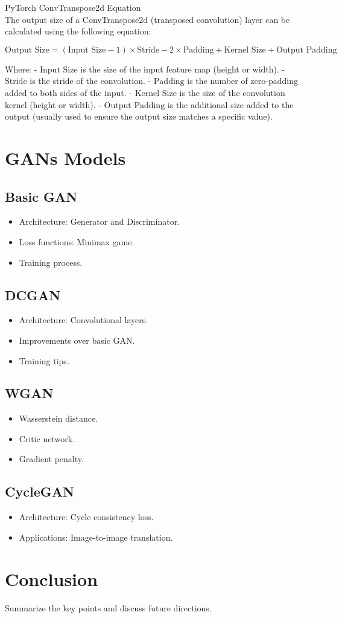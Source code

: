 \documentclass{article}
\begin{document}
PyTorch ConvTranspose2d Equation\\

The output size of a ConvTranspose2d (transposed convolution) layer can be calculated using the following equation:

\[ \text{Output Size} = (\text{Input Size} - 1) \times \text{Stride} - 2 \times \text{Padding} + \text{Kernel Size} + \text{Output Padding} \]

Where:
- \(\text{Input Size}\) is the size of the input feature map (height or width).
- \(\text{Stride}\) is the stride of the convolution.
- \(\text{Padding}\) is the number of zero-padding added to both sides of the input.
- \(\text{Kernel Size}\) is the size of the convolution kernel (height or width).
- \(\text{Output Padding}\) is the additional size added to the output (usually used to ensure the output size matches a specific value).


\section{GANs Models}
\label{sec:gans-models}
\subsection{Basic GAN}
\begin{itemize}
    \item Architecture: Generator and Discriminator.
    \item Loss functions: Minimax game.
    \item Training process.
\end{itemize}

\subsection{DCGAN}
\begin{itemize}
    \item Architecture: Convolutional layers.
    \item Improvements over basic GAN.
    \item Training tips.
\end{itemize}

\subsection{WGAN}
\begin{itemize}
    \item Wasserstein distance.
    \item Critic network.
    \item Gradient penalty.
\end{itemize}

\subsection{CycleGAN}
\begin{itemize}
    \item Architecture: Cycle consistency loss.
    \item Applications: Image-to-image translation.
\end{itemize}


\section{Conclusion}
\label{sec:conclusion}
Summarize the key points and discuss future directions.
\end{document}
